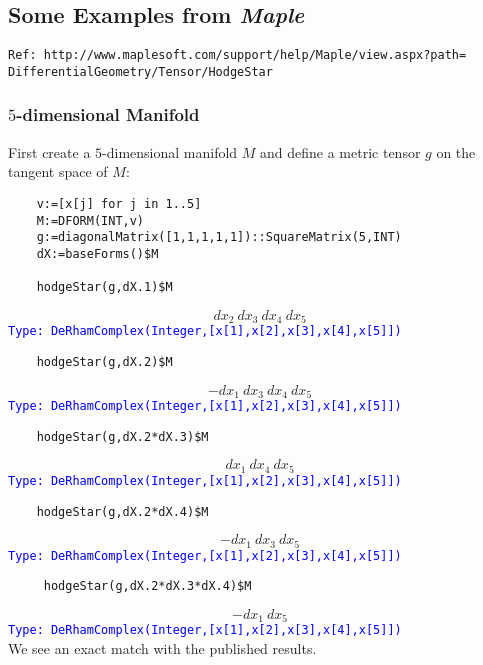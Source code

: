 \documentclass[12pt,a4paper]{article}
\newcommand{\type}[1]{\textcolor{blue}{\tt\tiny #1}}
\begin{document}
\subsection{Some Examples from {\it Maple}}
{\tiny\tt Ref: http://www.maplesoft.com/support/help/Maple/view.aspx?path=
DifferentialGeometry/Tensor/HodgeStar}

\subsubsection{$5$-dimensional Manifold} 
First create a $5$-dimensional manifold $M$ and define a metric tensor $g$ 
on the tangent space of $M$:
\begin{lstlisting}
    v:=[x[j] for j in 1..5]
    M:=DFORM(INT,v)
    g:=diagonalMatrix([1,1,1,1,1])::SquareMatrix(5,INT)
    dX:=baseForms()$M
       
    hodgeStar(g,dX.1)$M  
\end{lstlisting}
\begin{displaymath}
  {dx _ {2}} \  {dx _ {3}} \  {dx _ {4}} \  {dx _ {5}}
\end{displaymath}    
\type{Type: DeRhamComplex(Integer,[x[1],x[2],x[3],x[4],x[5]])}
\begin{lstlisting}
    hodgeStar(g,dX.2)$M
\end{lstlisting}
\begin{displaymath}
   -{{dx _ {1}} \  {dx _ {3}} \  {dx _ {4}} \  {dx _ {5}}}
\end{displaymath}    
\type{Type: DeRhamComplex(Integer,[x[1],x[2],x[3],x[4],x[5]])}
\begin{lstlisting}
    hodgeStar(g,dX.2*dX.3)$M
\end{lstlisting}
\begin{displaymath}
    {dx _ {1}} \  {dx _ {4}} \  {dx _ {5}}
\end{displaymath}        
\type{Type: DeRhamComplex(Integer,[x[1],x[2],x[3],x[4],x[5]])}
\begin{lstlisting}
    hodgeStar(g,dX.2*dX.4)$M
\end{lstlisting}
\begin{displaymath}
   -{{dx _ {1}} \  {dx _ {3}} \  {dx _ {5}}}
\end{displaymath}        
\type{Type: DeRhamComplex(Integer,[x[1],x[2],x[3],x[4],x[5]])}
\begin{lstlisting}
     hodgeStar(g,dX.2*dX.3*dX.4)$M
\end{lstlisting}
\begin{displaymath}
    -{{dx _ {1}} \  {dx _ {5}}}
\end{displaymath}         
\type{Type: DeRhamComplex(Integer,[x[1],x[2],x[3],x[4],x[5]])}
\\
We see an exact match with the published results. 
%
\end{document}
